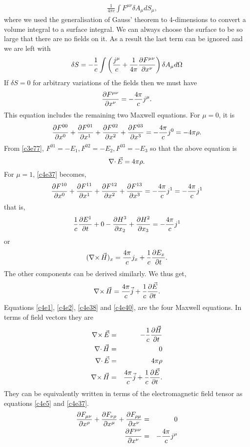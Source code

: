 \begin{enumerate}
\begin{eqnarray}
 & & \frac{1}{4\pi c}\int F^{\mu\nu}\delta A_\mu dS_\mu, \nonumber 
\end{eqnarray}
where we used the generalisation of Gauss' theorem to 4-dimensions to convert a
volume integral to a surface integral. We can always choose the surface to be so
large that there are no fields on it. As a result the last term can be ignored
and we are left with
\begin{equation}\label{c4e36}
\delta S = -\frac{1}{c}\int\left(\frac{j^\mu}{c} +
 \frac{1}{4\pi}\frac{\partial{F^{\mu\nu}}}{\partial{x^\nu}}\right)\delta A_\mu d\Omega
\end{equation}
If $\delta S = 0$ for arbitrary variations of the fields then we must have
\begin{equation}\label{c4e37}
\frac{\partial{F^{\mu\nu}}}{\partial{x^\nu}} = -\frac{4\pi}{c}j^\mu.
\end{equation}
This equation includes the remaining two Maxwell equations. For $\mu=0$, it is
\[
\frac{\partial{F^{00}}}{\partial{x^0}} + \frac{\partial{F^{01}}}{\partial{x^1}} + \frac{\partial{F^{02}}}{\partial{x^2}} + \frac{\partial{F^{03}}}{\partial{x^3}}
= -\frac{4\pi}{c}j^0 = -4\pi\rho.
\]
From \eqref{c3e77}, $F^{01} = -E_1, F^{02} = -E_2, F^{03} = -E_3$ so that the
above equation is
\begin{equation}\label{c4e38}
\operatorname{\nabla\cdot}\vec{E} = 4\pi\rho.
\end{equation}
For $\mu = 1$, \eqref{c4e37} becomes,
\[
\frac{\partial{F^{10}}}{\partial{x^0}} + \frac{\partial{F^{11}}}{\partial{x^1}} + \frac{\partial{F^{12}}}{\partial{x^2}} + \frac{\partial{F^{13}}}{\partial{x^3}}
= -\frac{4\pi}{c}j^1 = -\frac{4\pi}{c}j^1
\]
that is,
\[
\frac{1}{c}\frac{\partial{E^1}}{\partial{t}} + 0 - \frac{\partial{H^3}}{\partial{x_2}} + \frac{\partial{H^2}}{\partial{x_3}} = 
-\frac{4\pi}{c}j^1
\]
or
\begin{equation}\label{c4e39}
(\operatorname{\nabla\times}\vec{H})_x = \frac{4\pi}{c}j_x + \frac{1}{c}\frac{\partial{E_x}}{\partial{t}}.
\end{equation}
The other components can be derived similarly. We thus get,
\begin{equation}\label{c4e40}
\operatorname{\nabla\times}\vec{H} = \frac{4\pi}{c}\vec{j} + \frac{1}{c}\frac{\partial{\vec{E}}}{\partial{t}}.
\end{equation}
Equations \eqref{c4e1}, \eqref{c4e2}, \eqref{c4e38} and \eqref{c4e40}, are the
four Maxwell equations. In terms of field vectors they are
\begin{eqnarray*}
\operatorname{\nabla\times}\vec{E} &=& -\frac{1}{c}\frac{\partial{\vec{H}}}{\partial{t}} \\
\operatorname{\nabla\cdot}\vec{H} &=& 0 \\
\operatorname{\nabla\cdot}\vec{E} &=& 4\pi\rho \\
\operatorname{\nabla\times}\vec{H} &=& \frac{4\pi}{c}\vec{j} + \frac{1}{c}\frac{\partial{\vec{E}}}{\partial{t}}.
\end{eqnarray*}
They can be equivalently written in terms of the electromagnetic field tensor as
equations \eqref{c4e5} and \eqref{c4e37}.
\begin{eqnarray*}
\frac{\partial{F_{\mu\nu}}}{\partial{x^\rho}} + \frac{\partial{F_{\nu\rho}}}{\partial{x^\mu}} + 
\frac{\partial{F_{\rho\mu}}}{\partial{x^\nu}} &=& 0 \\
\frac{\partial{F^{\mu\nu}}}{\partial{x^\nu}} &=& -\frac{4\pi}{c}j^\mu
\end{eqnarray*}


\end{enumerate}
